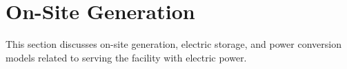 \chapter{On-Site Generation}\label{on-site-generation}

This section discusses on-site generation, electric storage, and power conversion models related to serving the facility with electric power.
